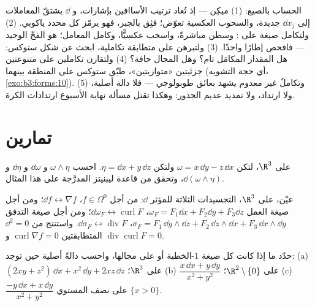 \begin{method}\label{met:b3:forms:method}
الحساب بالصيغ: (1) ميكِن --- إذ تُعاد ترتيب الأساافين بإشارات،
و $\dd$ يشتقّ المعاملات إلى $\dd
x_j$ جديدة، والسحوب العكسية
تعوّض؛ فثِق بالجبر، فهو يرمّز كل محدد ياكوبي. (2) ولتكامل صيغة
على : وسطن مباشرةً، واسحب عكسيًّا، وكامل المعامل؛
 هو الفخّ الوحيد --- فافحص إطارًا واحدًا. (3) ولتبرهن
على متطابقة تكاملية، ابحث عن شكل ستوكس: هل المقدار المكامَل
تام؟ وهل المجال حافة؟ (4) ولتقارن تكاملين على متنوعتين جزئيتين
«متوازيتين»، طبّق ستوكس على المنطقة بينهما (أي حجة التشويه،
\cref{exo:b3:forms:10}). (5) وتكاملٌ غير معدوم  يشهد بعائق
طوبولوجي --- فلا دالة أصلية، ولا ارتداد، ولا تمديد عديم الجذور:
وهكذا تقتل مسألة نهاية الأسبوع ارتدادات الكرة.
\end{method}

\section{تمارين}

\begin{exercise}[$\star$]\label{exo:b3:forms:1}
على $\R^3$، لتكن $\omega = x\,\dd y - z\,\dd x$ ولتكن $\eta =
\dd x + y\,\dd z$. احسب $\omega\wedge\eta$
و $\dd\omega$ و $\dd\eta$ و $\dd(\omega\wedge\eta)$، وتحقق من قاعدة ليبنيتز
المدرَّجة على هذا المثال.
\end{exercise}

\begin{exercise}[$\star$]\label{exo:b3:forms:2}
عيّن، على $\R^3$، التجسيدات الثلاثة للمؤثر $\dd$: من أجل
$f \in \Omega^0$، $\dd f \leftrightarrow \nabla f$؛ ومن أجل صيغة العمل $\omega_F = F_1\dd x + F_2\dd y + F_3\dd z$، $\dd\omega_F \leftrightarrow \operatorname{curl}F$؛
ومن أجل صيغة التدفق $\sigma_F = F_1\,\dd y\wedge\dd z + F_2\,\dd
z\wedge\dd x + F_3\,\dd x\wedge\dd y$، $\dd\sigma_F
\leftrightarrow \operatorname{div}F$. واستنتج من $\dd^2 =
0$
المتطابقتين $\operatorname{curl}\nabla f = 0$ و $\operatorname{div}\operatorname{curl}F = 0$.
\end{exercise}

\begin{exercise}[$\star\star$]\label{exo:b3:forms:3}
حدّد ما إذا كانت كل صيغة $1$-الخطية  أو  على مجالها،
واحسب دالةً أصلية حين توجد:
(a) $(2xy + z^2)\,\dd x + x^2\,\dd y + 2xz\,\dd z$ على $\R^3$؛
(b) $\dfrac{x\,\dd x + y\,\dd y}{x^2 + y^2}$ على $\R^2\setminus\{0\}$؛
(c) $\dfrac{-y\,\dd x + x\,\dd y}{x^2 + y^2}$ على نصف المستوي $\{x > 0\}$.
\end{exercise}

